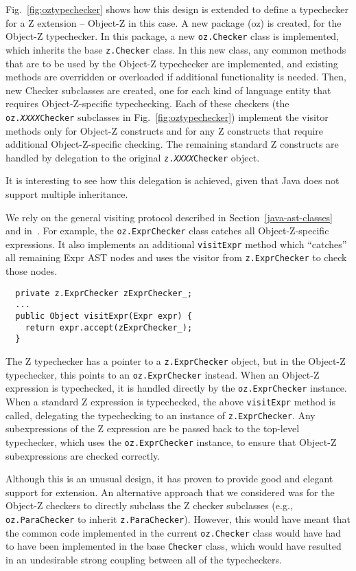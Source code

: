 \documentclass{llncs}
\begin{document}
Fig.~\ref{fig:oztypechecker} shows how this design is extended to
define a typechecker for a Z extension -- Object-Z in this case.  A
new package (oz) is created, for the Object-Z typechecker.  In this
package, a new {\tt oz.Checker} class is implemented, which inherits
the base {\tt z.Checker} class.  In this new class, any common methods
that are to be used by the Object-Z typechecker are implemented, and
existing methods are overridden or overloaded if additional
functionality is needed.  Then, new Checker subclasses are created,
one for each kind of language entity that requires Object-Z-specific
typechecking.  Each of these checkers (the
\texttt{oz.\emph{XXXX}Checker} subclasses in
Fig.~\ref{fig:oztypechecker}) implement the visitor methods only for
Object-Z constructs and for any Z constructs that require additional
Object-Z-specific checking.  The remaining standard Z constructs are
handled by delegation to the original
\texttt{z.\emph{XXXX}Checker} object.

It is interesting to see how this delegation is achieved, given that
Java does not support multiple inheritance.

We rely on the general
visiting protocol described in Section~\ref{java-ast-classes} and
in~\cite{czt}.  For example, the \texttt{oz.ExprChecker} class catches
all Object-Z-specific expressions.  It also implements an additional 
\texttt{visitExpr} method which ``catches'' all remaining Expr AST
nodes and uses the visitor from \texttt{z.ExprChecker} to check those
nodes.  
\begin{verbatim}
  private z.ExprChecker zExprChecker_;
  ...
  public Object visitExpr(Expr expr) {
    return expr.accept(zExprChecker_);
  }
\end{verbatim}

The Z typechecker has a pointer to a \texttt{z.ExprChecker} object,
but in the Object-Z typechecker, this points to an \texttt{oz.ExprChecker}
instead.  When an Object-Z expression is typechecked, it is handled
directly by the \texttt{oz.ExprChecker} instance.  When a standard Z
expression is typechecked, the above \texttt{visitExpr} method
is called, delegating the typechecking to an instance of 
\texttt{z.ExprChecker}.  Any subexpressions of the Z expression are
be passed back to the top-level typechecker, which uses the
\texttt{oz.ExprChecker} instance, to ensure that Object-Z subexpressions
are checked correctly.


Although this is an unusual design, it has proven to provide good
and elegant support for extension.  An alternative approach that we
considered was for the Object-Z checkers to directly subclass the Z
checker subclasses (e.g., \texttt{oz.ParaChecker} to inherit
\texttt{z.ParaChecker}).  However, this would have meant that the
common code implemented in the current
\texttt{oz.Checker} class would have had to have been
implemented in the base {\tt Checker} class, which would have resulted
in an undesirable strong coupling between all of the typecheckers.
\end{document}
